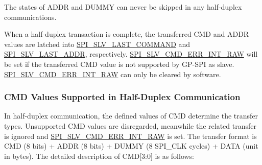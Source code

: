 \documentclass[main\_\_EN.tex]{subfiles}
\begin{document}
\begin{tiplisting}
The states of ADDR and DUMMY can never be skipped in any half-duplex communications.
\end{tiplisting}
\vspace{-1em}
When a half-duplex transaction is complete, the transferred CMD and ADDR values are latched into \hyperref[fielddesc:SPISLVLASTCOMMAND]{SPI\_SLV\_LAST\_COMMAND} and \hyperref[fielddesc:SPISLVLASTADDR]{SPI\_SLV\_LAST\_ADDR}, respectively. \hyperref[fielddesc:SPISLVCMDERRINTRAW]{SPI\_SLV\_CMD\_ERR\_INT\_RAW} will be set if the transferred CMD value is not supported by GP-SPI as slave. \hyperref[fielddesc:SPISLVCMDERRINTRAW]{SPI\_SLV\_CMD\_ERR\_INT\_RAW} can only be cleared by software.


\subsubsection{CMD Values Supported in Half-Duplex Communication} \label{GP-SPI HD salve format}

In half-duplex communication, the defined values of CMD determine the transfer types. Unsupported CMD values are disregarded, meanwhile the related transfer is ignored and \hyperref[fielddesc:SPISLVCMDERRINTRAW]{SPI\_SLV\_CMD\_ERR\_INT\_RAW} is set. The transfer format is CMD (8 bits) + ADDR (8 bits) + DUMMY (8 SPI\_CLK cycles) + DATA (unit in bytes). The detailed description of CMD[3:0] is as follows:
\end{document}
